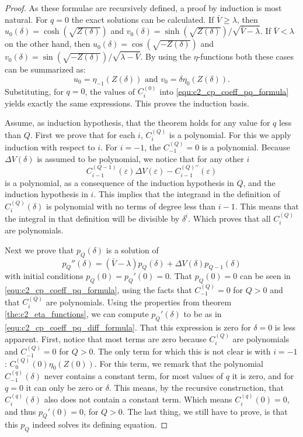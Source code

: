 \begin{proof}
    As these formulae are recursively defined, a proof by induction is most natural. For $q=0$ the exact solutions can be calculated. If $\bar{V} \geq \lambda$, then $u_0(\delta) = \cosh(\sqrt{Z(\delta)})$ and $v_0(\delta) = \sinh(\sqrt{Z(\delta)})/\sqrt{\bar{V} - \lambda}$. If $\bar{V} < \lambda$ on the other hand, then $u_0(\delta) = \cos(\sqrt{-Z(\delta)})$ and $v_0(\delta) = \sin(\sqrt{-Z(\delta)})/\sqrt{\lambda - \bar{V}}$. By using the $\eta$-functions both these cases can be summarized as:
    $$ u_0 = \eta_{-1}(Z(\delta)) \text{ and } v_0 = \delta\eta_{0}(Z(\delta))\text{.}$$
    Substituting, for $q=0$, the values of $C^{(0)}_i$ into \eqref{equ:c2_cp_coeff_pq_formula} yields exactly the same expressions. This proves the induction basis.

    Assume, as induction hypothesis, that the theorem holds for any value for $q$ less than $Q$. First we prove that for each $i$, $C_i^{(Q)}$ is a polynomial. For this we apply induction with respect to $i$. For $i = -1$, the $C^{(Q)}_{-1} =0$ is a polynomial. Because $\Delta V(\delta)$ is assumed to be polynomial, we notice that for any other $i$
    $$
        C_{i-1}^{(Q-1)}(\varepsilon) \Delta V(\varepsilon) - C_{i-1}^{(Q)\prime\prime}(\varepsilon)
    $$
    is a polynomial, as a consequence of the induction hypothesis in $Q$, and the induction hypothesis in $i$. This implies that the integrand in the definition of $C_i^{(Q)}(\delta)$ is polynomial with no terms of degree less than $i-1$. This means that the integral in that definition will be divisible by $\delta^i$. Which proves that all $C_{i}^{(Q)}$ are polynomials.

    Next we prove that $p_Q(\delta)$ is a solution of
    $$
        p_Q''(\delta)  = (\bar{V} - \lambda) p_Q(\delta) + \Delta V(\delta) p_{Q-1}(\delta)
    $$
    with initial conditions $p_Q(0) = p_Q'(0) = 0$. That $p_Q(0) = 0$ can be seen in \eqref{equ:c2_cp_coeff_pq_formula}, using the facts that $C^{(Q)}_{-1} = 0$ for $Q > 0$ and that $C_i^{(Q)}$ are polynomials. Using the properties from theorem \ref{the:c2_eta_functions}, we can compute $p_Q'(\delta)$ to be as in \eqref{equ:c2_cp_coeff_pq_diff_formula}. That this expression is zero for $\delta = 0$ is less apparent. First, notice that most terms are zero because $C_i^{(Q)}$ are polynomials and $C^{(Q)}_{-1} = 0$ for $Q > 0$. The only term for which this is not clear is with $i = -1$: $C_0^{(Q)}(0)\eta_{0}(Z(0))$. For this term, we remark that the polynomial $C^{(q)}_{-1}(\delta)$ never contains a constant term, for most values of $q$ it is zero, and for $q=0$ it can only be zero or $\delta$. This means, by the recursive construction, that $C_{i}^{(q)}(\delta)$ also does not contain a constant term. Which means $C_{i}^{(q)}(0) = 0$, and thus $p_Q'(0) = 0$, for $Q > 0$. The last thing, we still have to prove, is that this $p_Q$ indeed solves its defining equation.


\end{proof}
